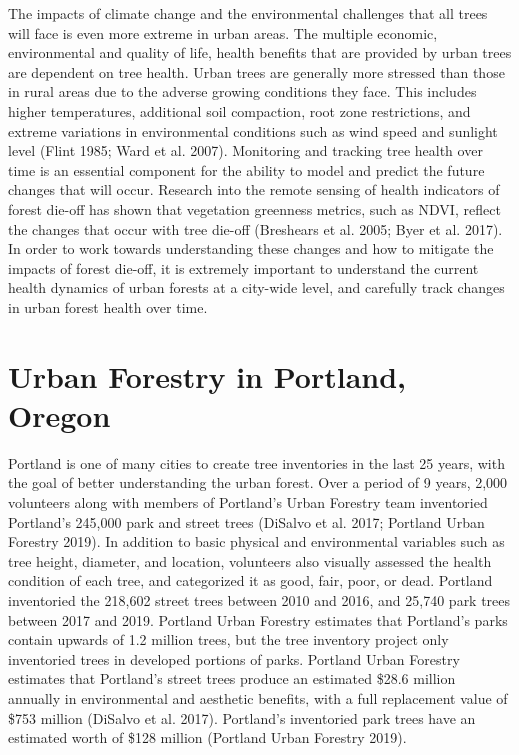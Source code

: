 \documentclass[12pt,twoside]{reedthesis}
\begin{document}
The impacts of climate change and the environmental challenges that all
trees will face is even more extreme in urban areas. The multiple
economic, environmental and quality of life, health benefits that are
provided by urban trees are dependent on tree health. Urban trees are
generally more stressed than those in rural areas due to the adverse
growing conditions they face. This includes higher temperatures,
additional soil compaction, root zone restrictions, and extreme
variations in environmental conditions such as wind speed and sunlight
level (Flint 1985; Ward et al. 2007). Monitoring and tracking tree health over
time is an essential component for the ability to model and predict the
future changes that will occur. Research into the remote sensing of
health indicators of forest die-off has shown that vegetation greenness
metrics, such as NDVI, reflect the changes that occur with tree die-off
(Breshears et al. 2005; Byer et al. 2017). In order to work towards understanding
these changes and how to mitigate the impacts of forest die-off, it is
extremely important to understand the current health dynamics of urban
forests at a city-wide level, and carefully track changes in urban
forest health over time.

\hypertarget{urban-forestry-in-portland-oregon}{%
\section{Urban Forestry in Portland, Oregon}\label{urban-forestry-in-portland-oregon}}

Portland is one of many cities to create tree inventories in the last 25
years, with the goal of better understanding the urban forest. Over a
period of 9 years, 2,000 volunteers along with members of Portland's
Urban Forestry team inventoried Portland's 245,000 park and street trees
(DiSalvo et al. 2017; Portland Urban Forestry 2019). In addition to basic
physical and environmental variables such as tree height, diameter, and
location, volunteers also visually assessed the health condition of each
tree, and categorized it as good, fair, poor, or dead. Portland
inventoried the 218,602 street trees between 2010 and 2016, and 25,740
park trees between 2017 and 2019. Portland Urban Forestry estimates that
Portland's parks contain upwards of 1.2 million trees, but the tree
inventory project only inventoried trees in developed portions of parks.
Portland Urban Forestry estimates that Portland's street trees produce
an estimated \$28.6 million annually in environmental and aesthetic
benefits, with a full replacement value of \$753 million (DiSalvo et al. 2017).
Portland's inventoried park trees have an estimated worth of \$128
million (Portland Urban Forestry 2019).
\end{document}
